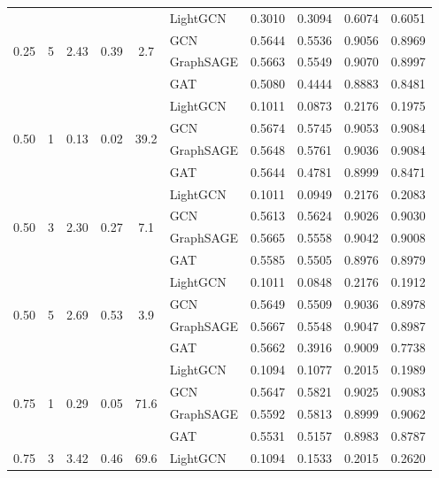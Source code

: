 {\begin{longtable}{cccccl rrrr}
\midrule
\multirow{4}{*}{0.25} & \multirow{4}{*}{5} & \multirow{4}{*}{2.43} & \multirow{4}{*}{0.39} & \multirow{4}{*}{2.7} & LightGCN & 0.3010 & 0.3094 & 0.6074 & 0.6051 \\
 & & & & & GCN & 0.5644 & 0.5536 & 0.9056 & 0.8969 \\
 & & & & & GraphSAGE & 0.5663 & 0.5549 & 0.9070 & 0.8997 \\
 & & & & & GAT & 0.5080 & 0.4444 & 0.8883 & 0.8481 \\
\midrule
\multirow{4}{*}{0.50} & \multirow{4}{*}{1} & \multirow{4}{*}{0.13} & \multirow{4}{*}{0.02} & \multirow{4}{*}{39.2} & LightGCN & 0.1011 & 0.0873 & 0.2176 & 0.1975 \\
 & & & & & GCN & 0.5674 & 0.5745 & 0.9053 & 0.9084 \\
 & & & & & GraphSAGE & 0.5648 & 0.5761 & 0.9036 & 0.9084 \\
 & & & & & GAT & 0.5644 & 0.4781 & 0.8999 & 0.8471 \\
\midrule
\multirow{4}{*}{0.50} & \multirow{4}{*}{3} & \multirow{4}{*}{2.30} & \multirow{4}{*}{0.27} & \multirow{4}{*}{7.1} & LightGCN & 0.1011 & 0.0949 & 0.2176 & 0.2083 \\
 & & & & & GCN & 0.5613 & 0.5624 & 0.9026 & 0.9030 \\
 & & & & & GraphSAGE & 0.5665 & 0.5558 & 0.9042 & 0.9008 \\
 & & & & & GAT & 0.5585 & 0.5505 & 0.8976 & 0.8979 \\
\midrule
\multirow{4}{*}{0.50} & \multirow{4}{*}{5} & \multirow{4}{*}{2.69} & \multirow{4}{*}{0.53} & \multirow{4}{*}{3.9} & LightGCN & 0.1011 & 0.0848 & 0.2176 & 0.1912 \\
 & & & & & GCN & 0.5649 & 0.5509 & 0.9036 & 0.8978 \\
 & & & & & GraphSAGE & 0.5667 & 0.5548 & 0.9047 & 0.8987 \\
 & & & & & GAT & 0.5662 & 0.3916 & 0.9009 & 0.7738 \\
\midrule
\multirow{4}{*}{0.75} & \multirow{4}{*}{1} & \multirow{4}{*}{0.29} & \multirow{4}{*}{0.05} & \multirow{4}{*}{71.6} & LightGCN & 0.1094 & 0.1077 & 0.2015 & 0.1989 \\
 & & & & & GCN & 0.5647 & 0.5821 & 0.9025 & 0.9083 \\
 & & & & & GraphSAGE & 0.5592 & 0.5813 & 0.8999 & 0.9062 \\
 & & & & & GAT & 0.5531 & 0.5157 & 0.8983 & 0.8787 \\
\midrule
\multirow{4}{*}{0.75} & \multirow{4}{*}{3} & \multirow{4}{*}{3.42} & \multirow{4}{*}{0.46} & \multirow{4}{*}{69.6} & LightGCN & 0.1094 & 0.1533 & 0.2015 & 0.2620 \\

\end{longtable}}
